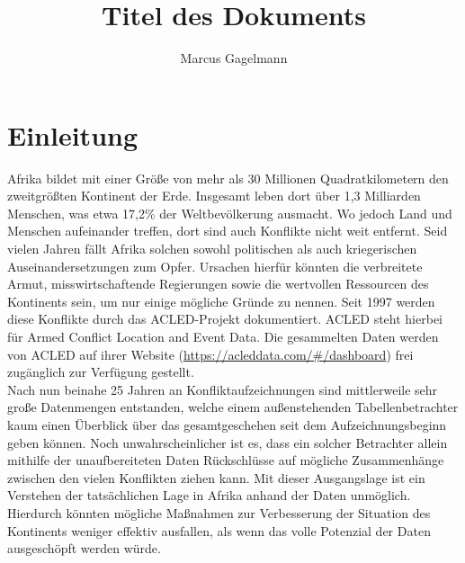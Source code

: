 \documentclass[usegeometry=true]{scrartcl}
\begin{document}
\subject{Projektbericht zum Modul Information Retrieval und Visualisierung Sommersemester 2021}
\title{Titel des Dokuments}
\author{Marcus Gagelmann}%
\maketitle%

\section{Einleitung}
Afrika bildet mit einer Größe von mehr als 30 Millionen Quadratkilometern den zweitgrößten Kontinent der Erde. Insgesamt leben dort über 1,3 Milliarden Menschen, was etwa 17,2\% der Weltbevölkerung ausmacht. Wo jedoch Land und Menschen aufeinander treffen, dort sind auch Konflikte nicht weit entfernt. Seid vielen Jahren fällt Afrika solchen sowohl politischen als auch kriegerischen Auseinandersetzungen zum Opfer. Ursachen hierfür könnten die verbreitete Armut, misswirtschaftende Regierungen sowie die wertvollen Ressourcen des Kontinents sein, um nur einige mögliche Gründe zu nennen. Seit 1997 werden diese Konflikte durch das ACLED-Projekt dokumentiert. ACLED steht hierbei für \glqq Armed Conflict Location and Event Data\grqq{}. Die gesammelten Daten werden von ACLED auf ihrer Website (\url{https://acleddata.com/#/dashboard}) frei zugänglich zur Verfügung gestellt.\\

Nach nun beinahe 25 Jahren an Konfliktaufzeichnungen sind mittlerweile sehr große Datenmengen entstanden, welche einem außenstehenden Tabellenbetrachter kaum einen Überblick über das gesamtgeschehen seit dem Aufzeichnungsbeginn geben können. Noch unwahrscheinlicher ist es, dass ein solcher Betrachter allein mithilfe der unaufbereiteten Daten Rückschlüsse auf mögliche Zusammenhänge zwischen den vielen Konflikten ziehen kann. Mit dieser Ausgangslage ist ein Verstehen der tatsächlichen Lage in Afrika anhand der Daten unmöglich. Hierdurch könnten mögliche Maßnahmen zur Verbesserung der Situation des Kontinents weniger effektiv ausfallen, als wenn das volle Potenzial der Daten ausgeschöpft werden würde.\\
\end{document}
